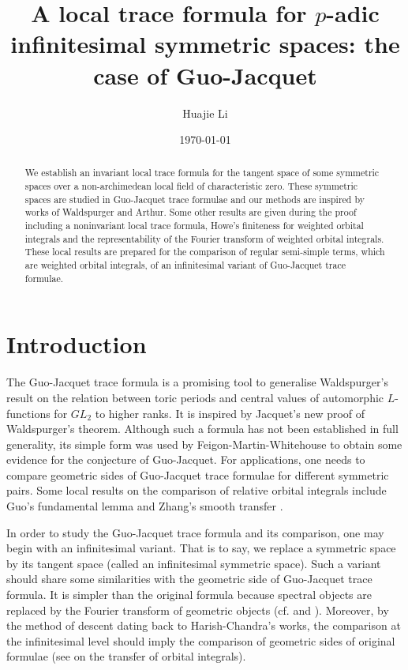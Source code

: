 \documentclass[a4paper]{amsart}
\theoremstyle{definition}
\theoremstyle{remark}
\numberwithin{equation}{subsection}
\begin{document}
\title{A local trace formula for $p$-adic infinitesimal symmetric spaces: the case of Guo-Jacquet}
\author{Huajie Li}
\date{\today}
\maketitle

\begin{abstract}

We establish an invariant local trace formula for the tangent space of some symmetric spaces over a non-archimedean local field of characteristic zero. These symmetric spaces are studied in Guo-Jacquet trace formulae and our methods are inspired by works of Waldspurger and Arthur. Some other results are given during the proof including a noninvariant local trace formula, Howe's finiteness for weighted orbital integrals and the representability of the Fourier transform of weighted orbital integrals. These local results are prepared for the comparison of regular semi-simple terms, which are weighted orbital integrals, of an infinitesimal variant of Guo-Jacquet trace formulae. 

\end{abstract}

\tableofcontents



\section{\textbf{Introduction}}

The Guo-Jacquet trace formula \cite{MR1382478} is a promising tool to generalise Waldspurger's result \cite{MR783511} on the relation between toric periods and central values of automorphic $L$-functions for $GL_2$ to higher ranks. It is inspired by Jacquet's new proof \cite{MR868299} of Waldspurger's theorem. Although such a formula has not been established in full generality, its simple form was used by Feigon-Martin-Whitehouse \cite{MR3805647} to obtain some evidence for the conjecture of Guo-Jacquet. For applications, one needs to compare geometric sides of Guo-Jacquet trace formulae for different symmetric pairs. Some local results on the comparison of relative orbital integrals include Guo's fundamental lemma \cite{MR1382478} and Zhang's smooth transfer \cite{MR3414387}. 

In order to study the Guo-Jacquet trace formula and its comparison, one may begin with an infinitesimal variant. That is to say, we replace a symmetric space by its tangent space (called an infinitesimal symmetric space). Such a variant should share some similarities with the geometric side of Guo-Jacquet trace formula. It is simpler than the original formula because spectral objects are replaced by the Fourier transform of geometric objects (cf. \cite{MR1344131} and \cite{MR1893921}). Moreover, by the method of descent dating back to Harish-Chandra's works, the comparison at the infinitesimal level should imply the comparison of geometric sides of original formulae (see \cite{MR3414387} on the transfer of orbital integrals). 
\end{document}
